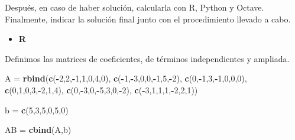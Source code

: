 \documentclass[
]{article}
\newenvironment{Shaded}{\begin{snugshade}}{\end{snugshade}}
\newcommand{\DecValTok}[1]{\textcolor[rgb]{0.00,0.00,0.81}{#1}}
\newcommand{\KeywordTok}[1]{\textcolor[rgb]{0.13,0.29,0.53}{\textbf{#1}}}
\newcommand{\NormalTok}[1]{#1}
\newcommand{\OperatorTok}[1]{\textcolor[rgb]{0.81,0.36,0.00}{\textbf{#1}}}
\newcommand{\StringTok}[1]{\textcolor[rgb]{0.31,0.60,0.02}{#1}}
\providecommand{\tightlist}{%
  \setlength{\itemsep}{0pt}\setlength{\parskip}{0pt}}
\begin{document}
Después, en caso de haber solución, calcularla con R, Python y Octave.
Finalmente, indicar la solución final junto con el procedimiento llevado
a cabo.

\begin{itemize}
\tightlist
\item
  \textbf{R}
\end{itemize}

Definimos las matrices de coeficientes, de términos independientes y
ampliada.

\begin{Shaded}
\begin{Highlighting}[]
\NormalTok{A =}\StringTok{ }\KeywordTok{rbind}\NormalTok{(}\KeywordTok{c}\NormalTok{(}\OperatorTok{-}\DecValTok{2}\NormalTok{,}\DecValTok{2}\NormalTok{,}\OperatorTok{-}\DecValTok{1}\NormalTok{,}\DecValTok{1}\NormalTok{,}\DecValTok{0}\NormalTok{,}\DecValTok{4}\NormalTok{,}\DecValTok{0}\NormalTok{), }\KeywordTok{c}\NormalTok{(}\OperatorTok{-}\DecValTok{1}\NormalTok{,}\OperatorTok{-}\DecValTok{3}\NormalTok{,}\DecValTok{0}\NormalTok{,}\DecValTok{0}\NormalTok{,}\OperatorTok{-}\DecValTok{1}\NormalTok{,}\DecValTok{5}\NormalTok{,}\OperatorTok{-}\DecValTok{2}\NormalTok{), }\KeywordTok{c}\NormalTok{(}\DecValTok{0}\NormalTok{,}\OperatorTok{-}\DecValTok{1}\NormalTok{,}\DecValTok{3}\NormalTok{,}\OperatorTok{-}\DecValTok{1}\NormalTok{,}\DecValTok{0}\NormalTok{,}\DecValTok{0}\NormalTok{,}\DecValTok{0}\NormalTok{), }\KeywordTok{c}\NormalTok{(}\DecValTok{0}\NormalTok{,}\DecValTok{1}\NormalTok{,}\DecValTok{0}\NormalTok{,}\DecValTok{3}\NormalTok{,}\OperatorTok{-}\DecValTok{2}\NormalTok{,}\DecValTok{1}\NormalTok{,}\DecValTok{4}\NormalTok{), }\KeywordTok{c}\NormalTok{(}\DecValTok{0}\NormalTok{,}\OperatorTok{-}\DecValTok{3}\NormalTok{,}\DecValTok{0}\NormalTok{,}\OperatorTok{-}\DecValTok{5}\NormalTok{,}\DecValTok{3}\NormalTok{,}\DecValTok{0}\NormalTok{,}\OperatorTok{-}\DecValTok{2}\NormalTok{), }\KeywordTok{c}\NormalTok{(}\OperatorTok{-}\DecValTok{3}\NormalTok{,}\DecValTok{1}\NormalTok{,}\DecValTok{1}\NormalTok{,}\DecValTok{1}\NormalTok{,}\OperatorTok{-}\DecValTok{2}\NormalTok{,}\DecValTok{2}\NormalTok{,}\DecValTok{1}\NormalTok{))}

\NormalTok{b =}\StringTok{ }\KeywordTok{c}\NormalTok{(}\DecValTok{5}\NormalTok{,}\DecValTok{3}\NormalTok{,}\DecValTok{5}\NormalTok{,}\DecValTok{0}\NormalTok{,}\DecValTok{5}\NormalTok{,}\DecValTok{0}\NormalTok{)}

\NormalTok{AB =}\StringTok{ }\KeywordTok{cbind}\NormalTok{(A,b)}
\end{Highlighting}
\end{Shaded}
\end{document}
